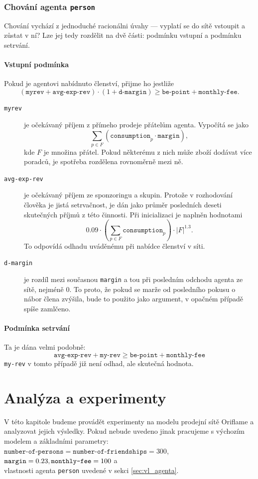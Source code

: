 \documentclass[a4wide,12pt]{report}
\begin{document}
\subsection{Chování agenta \texttt{person}}
Chování vychází z jednoduché racionálni úvahy --- vyplatí se do sítě vstoupit a zůstat v ní? Lze jej tedy rozdělit na dvě části: podmínku vstupní a podmínku setrvání.
\subsubsection{Vstupní podmínka}
Pokud je agentovi nabídnuto členství, přijme ho jestliže
\[(\texttt{myrev} + \texttt{avg-exp-rev}) \cdot (1+\texttt{d-margin}) \geq \texttt{be-point} + \texttt{monthly-fee}.\]
\begin{description}
\item[\texttt{myrev}] je očekávaný příjem z přímeho prodeje přátelům agenta. Vypočítá se jako \[\sum_{p\in F}(\texttt{consumption}_p\cdot\texttt{margin}),\]
kde $F$ je množina přátel. Pokud některému z nich může zboží dodávat více poradců, je spotřeba rozdělena rovnoměrně mezi ně.
\item[\texttt{avg-exp-rev}] je očekávaný příjem ze sponzoringu a skupin. Protože v rozhodování člověka je jistá setrvačnost, je dán jako průměr posledních deseti skutečných příjmů z této činnosti. Při inicializaci je naplněn hodnotami
\[ 0.09\cdot (\sum_{p\in F}\texttt{consumption}_p)\cdot |F|^{1.3}.\]
To odpovídá odhadu uváděnému při nabídce členství v síti.
\item[\texttt{d-margin}] je rozdíl mezi současnou \texttt{margin} a tou při posledním odchodu agenta ze sítě, nejméně 0. To proto, že pokud se marže od posledního pokusu o nábor člena zvýšila, bude to použito jako argument, v opačném případě spíše zamlčeno.
\end{description}
\subsubsection{Podmínka setrvání}
Ta je dána velmi podobně:
\[ \texttt{avg-exp-rev} + \texttt{my-rev} \geq \texttt{be-point} + \texttt{monthly-fee} \]
\texttt{my-rev} v tomto případě již není odhad, ale skutečná hodnota.
%
%
%
\chapter{Analýza a experimenty}
V této kapitole budeme provádět experimenty na modelu prodejní sítě Oriflame a analyzovat jejich výsledky. Pokud nebude uvedeno jinak pracujeme s výchozím modelem a základními parametry:\\
$\texttt{number-of-persons}=\texttt{number-of-friendships}=300$, \\
$\texttt{margin}=0.23,\\\texttt{monthly-fee}=100$ a\\
vlastnosti agenta \texttt{person} uvedené v sekci \ref{sec:vl_agenta}.
\end{document}
